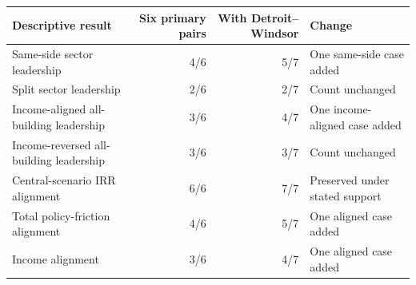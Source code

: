 \begin{tabular}{@{}lrrl@{}}
\toprule
Descriptive result & Six primary pairs & With Detroit--Windsor & Change \\
\midrule
Same-side sector leadership & 4/6 & 5/7 & One same-side case added \\
Split sector leadership & 2/6 & 2/7 & Count unchanged \\
Income-aligned all-building leadership & 3/6 & 4/7 & One income-aligned case added \\
Income-reversed all-building leadership & 3/6 & 3/7 & Count unchanged \\
Central-scenario IRR alignment & 6/6 & 7/7 & Preserved under stated support \\
Total policy-friction alignment & 4/6 & 5/7 & One aligned case added \\
Income alignment & 3/6 & 4/7 & One aligned case added \\
\bottomrule
\end{tabular}
